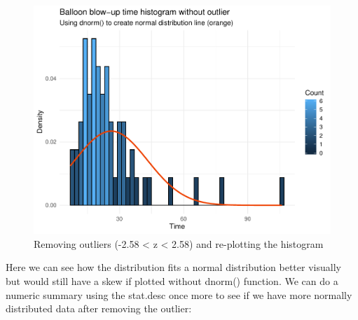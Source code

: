 \documentclass[]{article}
\newenvironment{Shaded}{\begin{snugshade}}{\end{snugshade}}
\newcommand{\FloatTok}[1]{\textcolor[rgb]{0.00,0.00,0.81}{#1}}
\newcommand{\KeywordTok}[1]{\textcolor[rgb]{0.13,0.29,0.53}{\textbf{#1}}}
\newcommand{\NormalTok}[1]{#1}
\newcommand{\OperatorTok}[1]{\textcolor[rgb]{0.81,0.36,0.00}{\textbf{#1}}}
\newcommand{\StringTok}[1]{\textcolor[rgb]{0.31,0.60,0.02}{#1}}
\begin{document}
\begin{Shaded}
\end{Shaded}

\begin{figure}
\centering
\includegraphics{Personality-Data-Analysis-Portfolio-1_files/figure-latex/unnamed-chunk-12-1.pdf}
\caption{\label{fig:unnamed-chunk-12}Removing outliers (-2.58 \textless{} z \textless{} 2.58) and re-plotting the histogram}
\end{figure}

Here we can see how the distribution fits a normal distribution better visually but would still have a skew if plotted without dnorm() function. We can do a numeric summary using the stat.desc once more to see if we have more normally distributed data after removing the outlier:
\end{document}
